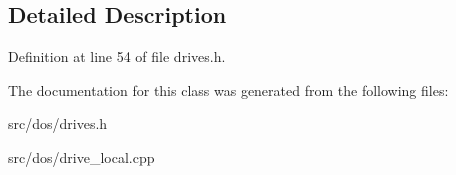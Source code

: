 \subsection{Detailed Description}


Definition at line 54 of file drives.\-h.



The documentation for this class was generated from the following files\-:\begin{DoxyCompactItemize}
\item 
src/dos/drives.\-h\item 
src/dos/drive\-\_\-local.\-cpp\end{DoxyCompactItemize}
